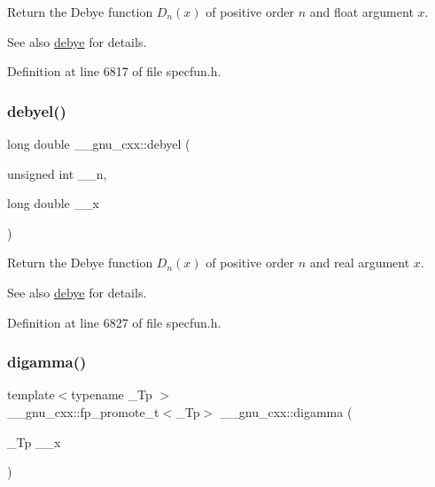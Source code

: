Return the Debye function $ D_n(x) $ of positive order $ n $ and {\ttfamily float} argument $ x $.

\begin{DoxySeeAlso}{See also}
\hyperlink{group__gnu__math__spec__func_ga0b14de47c011de3ebf771c9f29b2b78c}{debye} for details. 
\end{DoxySeeAlso}


Definition at line 6817 of file specfun.\+h.

\mbox{\label{group__gnu__math__spec__func_ga2db11e767b89bbd36be6ebfadda3401f}} 
\subsubsection{\texorpdfstring{debyel()}{debyel()}}
{\footnotesize\ttfamily long double \+\_\+\+\_\+gnu\+\_\+cxx\+::debyel (\begin{DoxyParamCaption}\item[{unsigned int}]{\+\_\+\+\_\+n,  }\item[{long double}]{\+\_\+\+\_\+x }\end{DoxyParamCaption})\hspace{0.3cm}{\ttfamily [inline]}}

Return the Debye function $ D_n(x) $ of positive order $ n $ and real argument $ x $.

\begin{DoxySeeAlso}{See also}
\hyperlink{group__gnu__math__spec__func_ga0b14de47c011de3ebf771c9f29b2b78c}{debye} for details. 
\end{DoxySeeAlso}


Definition at line 6827 of file specfun.\+h.

\mbox{\label{group__gnu__math__spec__func_ga7b87300edf8754d959e1d94fe0c9246e}} 
\subsubsection{\texorpdfstring{digamma()}{digamma()}}
{\footnotesize\ttfamily template$<$typename \+\_\+\+Tp $>$ \\
\+\_\+\+\_\+gnu\+\_\+cxx\+::fp\+\_\+promote\+\_\+t$<$\+\_\+\+Tp$>$ \+\_\+\+\_\+gnu\+\_\+cxx\+::digamma (\begin{DoxyParamCaption}\item[{\+\_\+\+Tp}]{\+\_\+\+\_\+x }\end{DoxyParamCaption})\hspace{0.3cm}{\ttfamily [inline]}}

